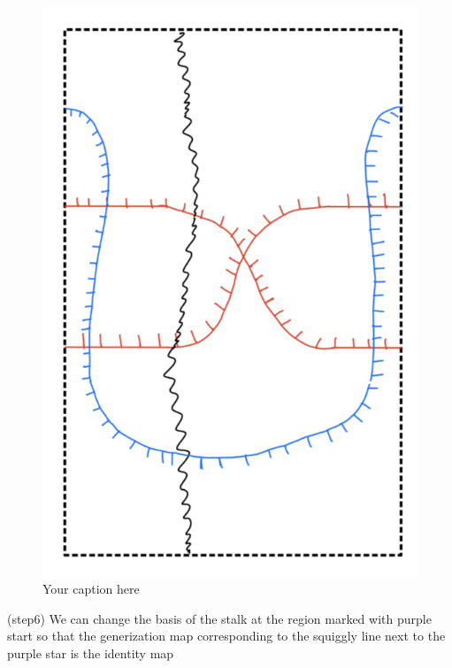 \begin{figure}[H] %
    \centering
    \includegraphics[scale = 0.95]{diagrams/lemma10/12.png} %
    \caption{Your caption here}
    \label{fig:your-label}
\end{figure}

(step6) We can change the basis of the stalk at the region marked with purple start so that the generization map corresponding to the squiggly line next to the purple star is the identity map

